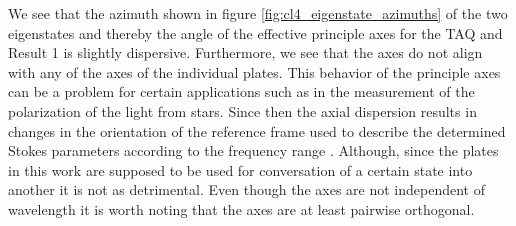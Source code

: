 We see that the azimuth shown in figure \ref{fig:cl4_eigenstate_azimuths} of the two eigenstates and thereby the angle of the effective principle axes for the TAQ and Result 1 is slightly dispersive. Furthermore, we see that the axes do not align with any of the axes of the individual plates. This behavior of the principle axes can be a problem for certain applications such as in the measurement of the polarization of the light from stars. Since then the axial dispersion results in changes in the orientation of the reference frame used to describe the determined Stokes parameters according to the frequency range \cite{Clarke2004, Bailey2019}. Although, since the plates in this work are supposed to be used for conversation of a certain state into another it is not as detrimental. Even though the axes are not independent of wavelength it is worth noting that the axes are at least pairwise orthogonal.

